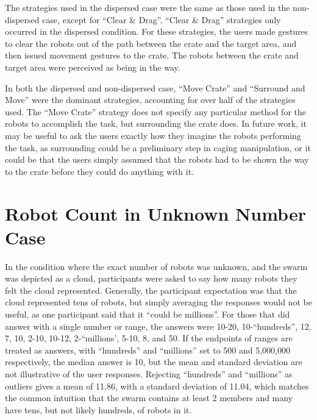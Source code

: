 The strategies used in the dispersed case were the same as those used in the non-dispersed case, except for ``Clear \& Drag''.
``Clear \& Drag'' strategies only occurred in the dispersed condition. 
For these strategies, the users made gestures to clear the robots out of the path between the crate and the target area, and then issued movement gestures to the crate. 
The robots between the crate and target area were perceived as being in the way. 

In both the dispersed and non-dispersed case, ``Move Crate'' and ``Surround and Move'' were the dominant strategies, accounting for over half of the strategies used. 
The ``Move Crate'' strategy does not specify any particular method for the robots to accomplish the task, but surrounding the crate does. 
In future work, it may be useful to ask the users exactly how they imagine the robots performing the task, as surrounding could be a preliminary step in caging manipulation, or it could be that the users simply assumed that the robots had to be shown the way to the crate before they could do anything with it. 

%
\section{Robot Count in Unknown Number Case} \label{section:Robot_Count_in_Unknown_Number_Case}

In the condition where the exact number of robots was unknown, and the swarm was depicted as a cloud, participants were asked to say how many robots they felt the cloud represented. 
Generally, the participant expectation was that the cloud represented tens of robots, but simply averaging the responses would not be useful, as one participant said that it ``could be millions''. 
For those that did answer with a single number or range, the answers were 10-20, 10-``hundreds'', 12, 7, 10, 2-10, 10-12, 2-``millions', 5-10, 8, and 50. 
If the endpoints of ranges are treated as answers, with ``hundreds'' and ``millions'' set to 500 and 5,000,000 respectively, the median answer is 10, but the mean and standard deviation are not illustrative of the user responses. 
Rejecting ``hundreds'' and ``millions'' as outliers gives a mean of 11.86, with a standard deviation of 11.04, which matches the common intuition that the swarm contains at least 2 members and many have tens, but not likely hundreds, of robots in it.

